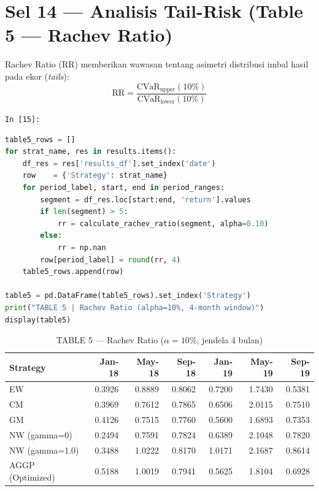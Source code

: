 \documentclass[12pt,a4paper]{article}
\newcommand{\cellIn}[1]{%
  \begin{tcolorbox}[cellheader]
    \texttt{In [#1]:}
  \end{tcolorbox}\vspace{-6pt}%
}
\begin{document}
\section{Sel 14 --- Analisis Tail-Risk (Table 5 --- Rachev Ratio)}

Rachev Ratio (RR) memberikan wawasan tentang asimetri distribusi imbal hasil
pada ekor (\emph{tails}):
\[
  \text{RR} = \frac{\text{CVaR}_{\text{upper}}(10\%)}{\text{CVaR}_{\text{lower}}(10\%)}
\]

\cellIn{15}
\begin{tcolorbox}[codebox]
\begin{lstlisting}[language=Python, numbers=none]
table5_rows = []
for strat_name, res in results.items():
    df_res = res['results_df'].set_index('date')
    row    = {'Strategy': strat_name}
    for period_label, start, end in period_ranges:
        segment = df_res.loc[start:end, 'return'].values
        if len(segment) > 5:
            rr = calculate_rachev_ratio(segment, alpha=0.10)
        else:
            rr = np.nan
        row[period_label] = round(rr, 4)
    table5_rows.append(row)

table5 = pd.DataFrame(table5_rows).set_index('Strategy')
print("TABLE 5 | Rachev Ratio (alpha=10%, 4-month window)")
display(table5)
\end{lstlisting}
\end{tcolorbox}

\vspace{6pt}
\begin{table}[H]
  \centering
  \caption{TABLE 5 --- Rachev Ratio ($\alpha=10\%$, jendela 4 bulan)}
  \small
  \begin{tabular}{lrrrrrr}
    \toprule
    \textbf{Strategy} & \textbf{Jan-18} & \textbf{May-18} & \textbf{Sep-18} & \textbf{Jan-19} & \textbf{May-19} & \textbf{Sep-19} \\
    \midrule
    \midrule
    EW                        & 0.3926 & 0.8889 & 0.8062 & 0.7200 & 1.7430 & 0.5381 \\
    CM                        & 0.3969 & 0.7612 & 0.7865 & 0.6506 & 2.0115 & 0.7510 \\
    GM                        & 0.4126 & 0.7515 & 0.7760 & 0.5600 & 1.6893 & 0.7353 \\
    NW (gamma=0)              & 0.2494 & 0.7591 & 0.7824 & 0.6389 & 2.1048 & 0.7820 \\
    NW (gamma=1.0)            & 0.3488 & 1.0222 & 0.8170 & 1.0171 & 2.1687 & 0.8614 \\
    AGGP (Optimized)          & 0.5188 & 1.0019 & 0.7941 & 0.5625 & 1.8104 & 0.6928 \\
    \bottomrule
  \end{tabular}
\end{table}
\end{document}
